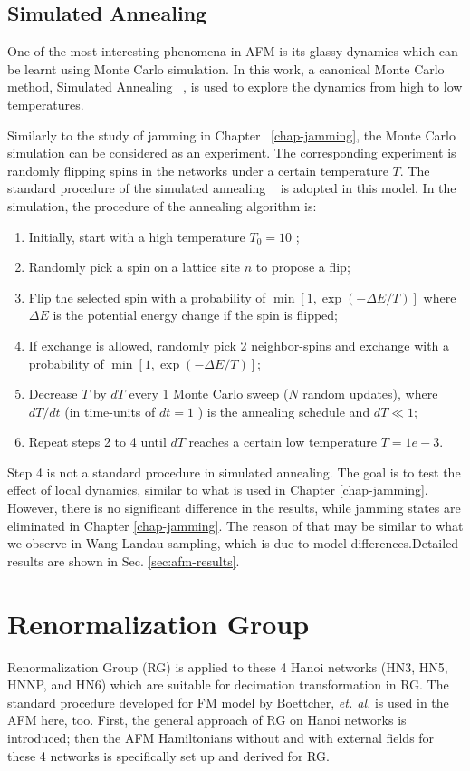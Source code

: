 \subsection{Simulated Annealing}
One of the most interesting phenomena in AFM is its glassy dynamics which can be learnt using Monte Carlo simulation. In this work, a canonical Monte Carlo method, Simulated Annealing ~\cite{SA}, is used to explore the dynamics from high to low temperatures. 

Similarly to the study of jamming in Chapter ~\ref{chap-jamming}, the Monte Carlo simulation can be considered as an experiment. The corresponding experiment is randomly flipping spins in the networks under a certain temperature $T$.  The standard procedure of the simulated annealing ~\cite{Vcerny1985} is adopted in this model. In the simulation, the procedure of the annealing algorithm is: 
\begin{enumerate}
\item Initially, start with a high temperature $T_{0}=10$ ; 
\item Randomly pick a spin on a lattice site $n$ to propose a flip; 
\item Flip the selected spin with a probability of $\min\left[1, \exp(-\Delta E /T)\right]$ 
where $\Delta E$ is the potential energy change if the spin is flipped; 
\item If exchange is allowed, randomly pick 2 neighbor-spins and exchange with a probability of $\min\left[1, \exp(-\Delta E /T)\right]$; 
\item Decrease $T$ by $dT$ every 1 Monte Carlo sweep ($N$ random
updates), where $dT/dt$ (in time-units of $dt=1$ ) is the annealing
schedule and $dT\ll1$; 
\item Repeat steps 2 to 4 until $dT$ reaches a certain low temperature $T=1e-3$. 
\end{enumerate}

Step 4 is not a standard procedure in simulated annealing. The goal is to test the effect of local dynamics, similar to what is used in Chapter \ref{chap-jamming}. However, there is no significant difference in the results, while jamming states are eliminated in Chapter \ref{chap-jamming}. The reason of that may be similar to what we observe in Wang-Landau sampling, which is due to model differences.Detailed results are shown in Sec. \ref{sec:afm-results}.



\section{Renormalization Group}
\label{sec:afm-rg}
Renormalization Group (RG) is applied to these 4 Hanoi networks (HN3, HN5, HNNP, and HN6) which are suitable for decimation transformation in RG. The standard procedure developed for FM model by Boettcher, {\it et. al.} \cite{Boettcher2011HNNP, boettcher2015classification} is used in the AFM here, too. First, the general approach of RG on Hanoi networks is introduced; then the AFM Hamiltonians without and with external fields for these 4 networks is specifically set up and derived for RG.


